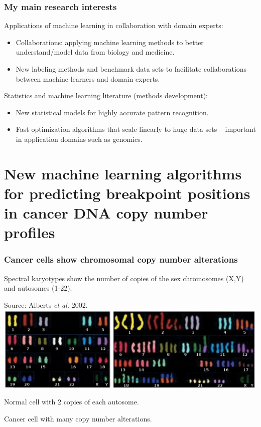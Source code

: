 \documentclass{beamer}
\begin{document}
\begin{frame}
  \frametitle{My main research interests}
  Applications of machine learning in collaboration with domain experts:
  \begin{itemize}
  \item Collaborations: applying machine learning methods to better
    understand/model data from biology and
    medicine.
  \item New labeling methods and benchmark data sets to facilitate
    collaborations between machine learners and domain experts.
  \end{itemize}
  Statistics and machine learning literature (methods development):
  \begin{itemize}
  \item New statistical models for highly accurate pattern
    recognition.
  \item Fast optimization algorithms that scale linearly to huge data
    sets -- important in application domains such as genomics.
  \end{itemize}
\end{frame}

\section{New machine learning algorithms for predicting breakpoint positions in cancer DNA copy number profiles}

\begin{frame}
  \frametitle{Cancer cells show chromosomal copy number alterations}
  Spectral karyotypes show the number of copies of the sex chromosomes
  (X,Y) and autosomes (1-22). 

  Source: Alberts \emph{et al.} 2002.
\vskip 0.1in
  \includegraphics[width=\textwidth]{Karyo-both}
\vskip 0.1in
  \begin{minipage}{0.4\linewidth}
    Normal cell with 2 copies of each autosome.
  \end{minipage}
\linewidth
  \begin{minipage}{0.4\linewidth}
Cancer cell with many copy number alterations.
  \end{minipage}
\end{frame}
\end{document}
